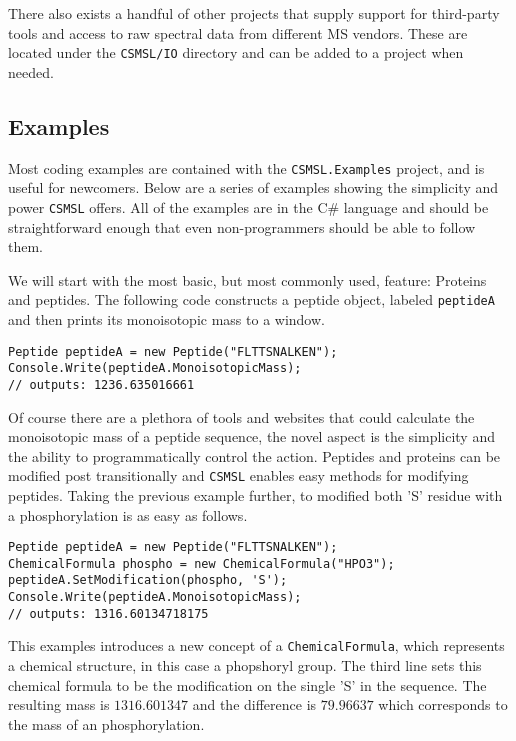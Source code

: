 There also exists a handful of other projects that supply support for third-party tools and access to raw spectral data from different MS vendors. These are located under the \texttt{CSMSL/IO} directory and can be added to a project when needed.

\subsection*{Examples}
Most coding examples are contained with the \texttt{CSMSL.Examples} project, and is useful for newcomers. Below are a series of examples showing the simplicity and power \texttt{CSMSL} offers. All of the examples are in the C\# language and should be straightforward enough that even non-programmers should be able to follow them.

We will start with the most basic, but most commonly used, feature: Proteins and peptides. The following code constructs a peptide object, labeled \texttt{peptideA} and then prints its monoisotopic mass to a window.

\begin{lstlisting}
Peptide peptideA = new Peptide("FLTTSNALKEN");
Console.Write(peptideA.MonoisotopicMass);
// outputs: 1236.635016661
\end{lstlisting}

Of course there are a plethora of tools and websites that could calculate the monoisotopic mass of a peptide sequence, the novel aspect is the simplicity and the ability to programmatically control the action. Peptides and proteins can be modified post transitionally and \texttt{CSMSL} enables easy methods for modifying peptides. Taking the previous example further, to modified both 'S' residue with a phosphorylation is as easy as follows.

\begin{lstlisting}
Peptide peptideA = new Peptide("FLTTSNALKEN");
ChemicalFormula phospho = new ChemicalFormula("HPO3");
peptideA.SetModification(phospho, 'S');
Console.Write(peptideA.MonoisotopicMass);
// outputs: 1316.60134718175
\end{lstlisting}

This examples introduces a new concept of a \texttt{ChemicalFormula}, which represents a chemical structure, in this case a phopshoryl group. The third line sets this chemical formula to be the modification on the single 'S' in the sequence. The resulting mass is $1316.601347$ and the difference is $79.96637$ which corresponds to the mass of an phosphorylation.

